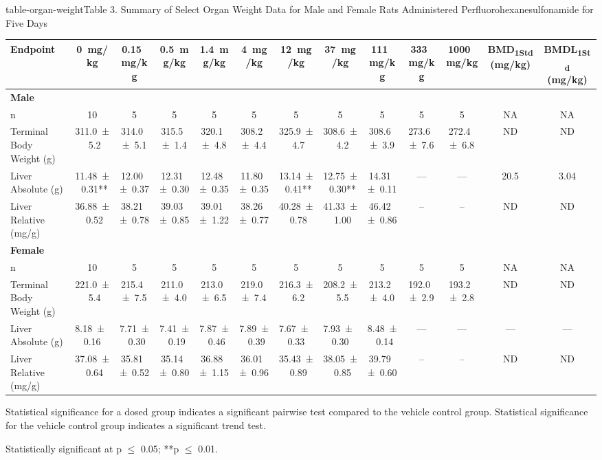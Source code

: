 \begin{landscape}
\begin{niehstable}{table-organ-weight}{Table 3. Summary of Select Organ Weight Data for Male and Female Rats Administered Perfluorohexanesulfonamide for Five Days}
\begin{tabular}{lcccccccccccc}
\toprule
Endpoint & 0~mg/kg & 0.15~mg/kg & 0.5~mg/kg & 1.4~mg/kg & 4~mg/kg & 12~mg/kg & 37~mg/kg & 111~mg/kg & 333~mg/kg & 1000~mg/kg & BMD\textsubscript{1Std} (mg/kg) & BMDL\textsubscript{1Std} (mg/kg) \\
\midrule
\multicolumn{13}{l}{\textbf{Male}} \\
n & 10 & 5 & 5 & 5 & 5 & 5 & 5 & 5 & 5 & 5 & NA & NA \\
Terminal Body Weight (g) & 311.0 ± 5.2 & 314.0 ± 5.1 & 315.5 ± 1.4 & 320.1 ± 4.8 & 308.2 ± 4.4 & 325.9 ± 4.7 & 308.6 ± 4.2 & 308.6 ± 3.9 & 273.6 ± 7.6 & 272.4 ± 6.8 & ND & ND \\
Liver Absolute (g) & 11.48 ± 0.31** & 12.00 ± 0.37 & 12.31 ± 0.30 & 12.48 ± 0.35 & 11.80 ± 0.35 & 13.14 ± 0.41** & 12.75 ± 0.30** & 14.31 ± 0.11 & — & — & 20.5 & 3.04 \\
Liver Relative (mg/g) & 36.88 ± 0.52 & 38.21 ± 0.78 & 39.03 ± 0.85 & 39.01 ± 1.22 & 38.26 ± 0.77 & 40.28 ± 0.78 & 41.33 ± 1.00 & 46.42 ± 0.86 & – & – & ND & ND \\
\multicolumn{13}{l}{\textbf{Female}} \\
n & 10 & 5 & 5 & 5 & 5 & 5 & 5 & 5 & 5 & 5 & NA & NA \\
Terminal Body Weight (g) & 221.0 ± 5.4 & 215.4 ± 7.5 & 211.0 ± 4.0 & 213.0 ± 6.5 & 219.0 ± 7.4 & 216.3 ± 6.2 & 208.2 ± 5.5 & 213.2 ± 4.0 & 192.0 ± 2.9 & 193.2 ± 2.8 & ND & ND \\
Liver Absolute (g) & 8.18 ± 0.16 & 7.71 ± 0.30 & 7.41 ± 0.19 & 7.87 ± 0.46 & 7.89 ± 0.39 & 7.67 ± 0.33 & 7.93 ± 0.30 & 8.48 ± 0.14 & — & — & — & — \\
Liver Relative (mg/g) & 37.08 ± 0.64 & 35.81 ± 0.52 & 35.14 ± 0.80 & 36.88 ± 1.15 & 36.01 ± 0.96 & 35.43 ± 0.89 & 38.05 ± 0.85 & 39.79 ± 0.60 & – & – & ND & ND \\
\bottomrule
\end{tabular}
\begin{tablenotes}
\item Statistical significance for a dosed group indicates a significant pairwise test compared to the vehicle control group. Statistical significance for the vehicle control group indicates a significant trend test.
\item *Statistically significant at p \ensuremath{\le} 0.05; **p \ensuremath{\le} 0.01.

\end{tablenotes}
\end{niehstable}
\end{landscape}
